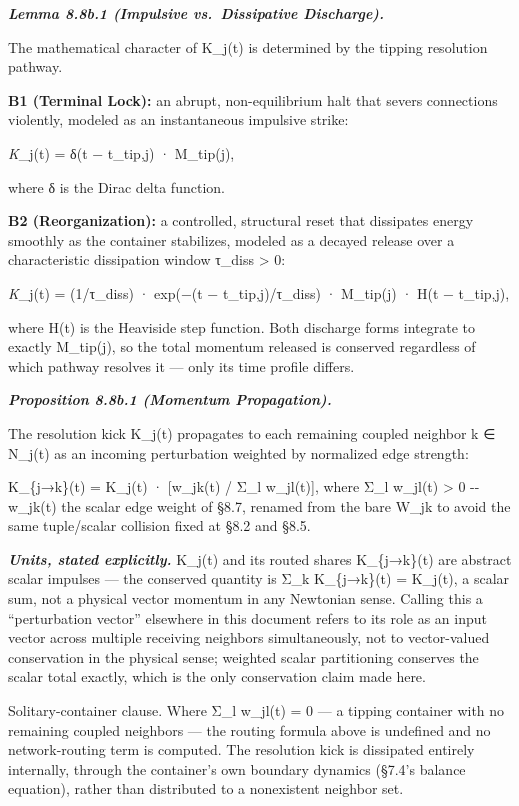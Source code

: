 \documentclass[
]{article}
\begin{document}
\emph{\textbf{Lemma 8.8b.1 (Impulsive vs.~Dissipative Discharge).}}

The mathematical character of K\_j(t) is determined by the tipping
resolution pathway.

\textbf{B1 (Terminal Lock):} an abrupt, non-equilibrium halt that severs
connections violently, modeled as an instantaneous impulsive strike:

\emph{K}\_j(t) = δ(t − t\_tip,j) · M\_tip(j),

where δ is the Dirac delta function.

\textbf{B2 (Reorganization):} a controlled, structural reset that
dissipates energy smoothly as the container stabilizes, modeled as a
decayed release over a characteristic dissipation window τ\_diss
\textgreater{} 0:

\emph{K}\_j(t) = (1/τ\_diss) · exp(−(t − t\_tip,j)/τ\_diss) · M\_tip(j)
· H(t − t\_tip,j),

where H(t) is the Heaviside step function. Both discharge forms
integrate to exactly M\_tip(j), so the total momentum released is
conserved regardless of which pathway resolves it --- only its time
profile differs.

\emph{\textbf{Proposition 8.8b.1 (Momentum Propagation).}}

The resolution kick K\_j(t) propagates to each remaining coupled
neighbor k ∈ N\_j(t) as an incoming perturbation weighted by normalized
edge strength:

K\_\{j→k\}(t) = K\_j(t) · {[}w\_jk(t) / Σ\_l w\_jl(t){]}, where Σ\_l
w\_jl(t) \textgreater{} 0 -\/- w\_jk(t) the scalar edge weight of §8.7,
renamed from the bare W\_jk to avoid the same tuple/scalar collision
fixed at §8.2 and §8.5.

\emph{\textbf{Units, stated explicitly.}} K\_j(t) and its routed shares
K\_\{j→k\}(t) are abstract scalar impulses --- the conserved quantity is
Σ\_k K\_\{j→k\}(t) = K\_j(t), a scalar sum, not a physical vector
momentum in any Newtonian sense. Calling this a ``perturbation vector''
elsewhere in this document refers to its role as an input vector across
multiple receiving neighbors simultaneously, not to vector-valued
conservation in the physical sense; weighted scalar partitioning
conserves the scalar total exactly, which is the only conservation claim
made here.

Solitary-container clause. Where Σ\_l w\_jl(t) = 0 --- a tipping
container with no remaining coupled neighbors --- the routing formula
above is undefined and no network-routing term is computed. The
resolution kick is dissipated entirely internally, through the
container's own boundary dynamics (§7.4's balance equation), rather than
distributed to a nonexistent neighbor set.
\end{document}
